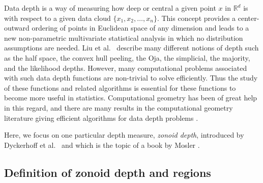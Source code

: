 \documentclass{elsart}
\begin{document}
Data depth is a way of measuring how deep or central a given point $x$
in $\mathbb{R}^d$ is with respect to a given data cloud $\{x_1, x_2,
\ldots, x_n\}$. This concept provides a center-outward ordering of
points in Euclidean space of any dimension and leads to a new
non-parametric multivariate statistical analysis in which no
distribution assumptions are needed. Liu et al.\
\cite{multivariate_analysis_by_data_depth} describe many different
notions of depth such as the half space, the convex hull peeling, the
Oja, the simplicial, the majority, and the likelihood depths. However,
many computational problems associated with such data depth functions
are non-trivial to solve efficiently.  Thus the study of these
functions and related algorithms is essential for these functions to
become more useful in statistics. Computational geometry
\cite{preparata_book} has been of great help in this regard, and there
are many results in the computational geometry literature giving
efficient algorithms for data depth problems
\cite{regression_depth_and_center_points, aloupis_mcs_thesis,
algorithms_for_bivariate_medians_and_a_fermat_torricelli_problem_for_lines,
an_optimized_randomized_algorithm_for_maximum_tukey_depth,
on_khulls_and_related_problems,
zonoid_data_depth_theory_and_computation,
computing_the_centerpoint_of_a_finite_planar_set_of_points_in_linear_time,
on_a_triangle_counting_problem, langerman_phd_thesis,
the_complexity_of_hyperplane_depth_in_the_plane,
optimization_in_arrangements,
computing_the_center_of_planar_point_sets,
fast_implementation_of_depth_contours_using_topological_sweep,
statistical_algorithms_the_oja_bivariate_median,
efficient_algorithms_for_maximum_regression_depth,
a_lower_bound_for_computing_oja_depth,
on_the_computation_of_the_bivariate_median_and_a_fermat_torricelli_problem,
on_the_convex_layers_of_a_planar_set,
on_algorithms_for_simplicial_depth,
constructing_the_bivariate_tukey_median,
geometry_and_statistics_problems_at_the_interface,
some_new_algorithms_and_software_implementation_methods_for_pattern_recognition_research}.

Here, we focus on one particular depth measure, \emph{zonoid depth},
introduced by Dyckerhoff et al.\
\cite{zonoid_data_depth_theory_and_computation} and which is the topic
of a book by Mosler \cite{mosler_book}.

\subsection{Definition of zonoid depth and regions}
\label{subsection_definition_of_zonoid_depth_and_regions}
\end{document}
